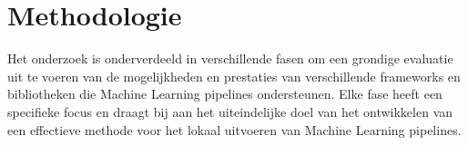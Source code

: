 






\section{Methodologie}%
\label{sec:methodologie}
Het onderzoek is onderverdeeld in verschillende fasen om een grondige evaluatie uit te voeren van de mogelijkheden en prestaties van verschillende frameworks en bibliotheken die Machine Learning pipelines ondersteunen. Elke fase heeft een specifieke focus en draagt bij aan het uiteindelijke doel van het ontwikkelen van een effectieve methode voor het lokaal uitvoeren van Machine Learning pipelines.
